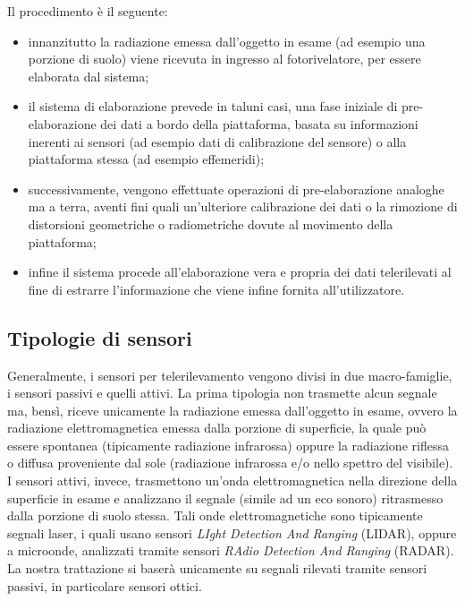 Il procedimento è il seguente:
\begin{itemize}
\item innanzitutto la radiazione emessa dall'oggetto in esame (ad esempio una porzione di suolo) viene ricevuta in ingresso al fotorivelatore, per essere elaborata dal sistema;
\item il sistema di elaborazione prevede in taluni casi, una fase iniziale di pre-elaborazione dei dati a bordo della piattaforma, basata su informazioni inerenti ai sensori (ad esempio dati di calibrazione del sensore) o alla piattaforma stessa (ad esempio effemeridi);
\item successivamente, vengono effettuate operazioni di pre-elaborazione analoghe ma a terra, aventi fini quali un'ulteriore calibrazione dei dati o la rimozione di distorsioni geometriche o radiometriche dovute al movimento della piattaforma;
\item infine il sistema procede all'elaborazione vera e propria dei dati telerilevati al fine di estrarre l'informazione che viene infine fornita all'utilizzatore.
\end{itemize}


\subsection{Tipologie di sensori}

Generalmente, i sensori per telerilevamento vengono divisi in due macro-famiglie, i sensori passivi e quelli attivi.
La prima tipologia non trasmette alcun segnale ma, bensì, riceve unicamente la radiazione emessa dall'oggetto in esame, ovvero la radiazione elettromagnetica emessa dalla porzione di superficie, la quale può essere spontanea (tipicamente radiazione infrarossa) oppure la radiazione riflessa o diffusa proveniente dal sole (radiazione infrarossa e/o nello spettro del visibile).
I sensori attivi, invece, trasmettono un'onda elettromagnetica nella direzione della superficie in esame e analizzano il segnale (simile ad un eco sonoro) ritrasmesso dalla porzione di suolo stessa.
Tali onde elettromagnetiche sono tipicamente segnali laser, i quali usano sensori \emph{LIght Detection And Ranging} (LIDAR), oppure a microonde, analizzati tramite sensori \emph{RAdio Detection And Ranging} (RADAR).
\\

La nostra trattazione si baserà unicamente su segnali rilevati tramite sensori passivi, in particolare sensori ottici.  


